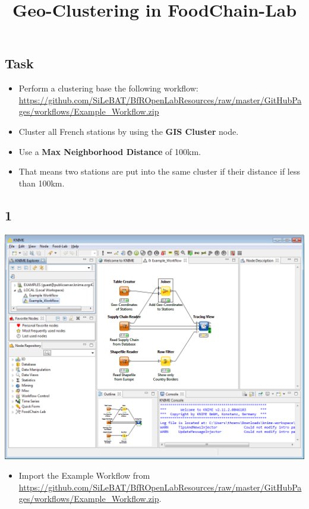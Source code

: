 \documentclass{beamer}
\title{Geo-Clustering in FoodChain-Lab}
\date{}
\begin{document}
\maketitle

\section{ }

\subsection{Task}
\begin{frame}
	\begin{itemize}
		\item Perform a clustering base the following workflow: \url{https://github.com/SiLeBAT/BfROpenLabResources/raw/master/GitHubPages/workflows/Example_Workflow.zip}
		\item Cluster all French stations by using the \textbf{GIS Cluster} node.
		\item Use a \textbf{Max Neighborhood Distance} of 100km.
		\item That means two stations are put into the same cluster if their distance if less than 100km.
	\end{itemize}
\end{frame}
 
\subsection{1}
\begin{frame}
	\begin{center}
  		\includegraphics[height=0.6\textheight]{1.png}
	\end{center}
	\begin{itemize}
		\item Import the Example Workflow from \url{https://github.com/SiLeBAT/BfROpenLabResources/raw/master/GitHubPages/workflows/Example_Workflow.zip}.
	\end{itemize}
\end{frame}
\end{document}
